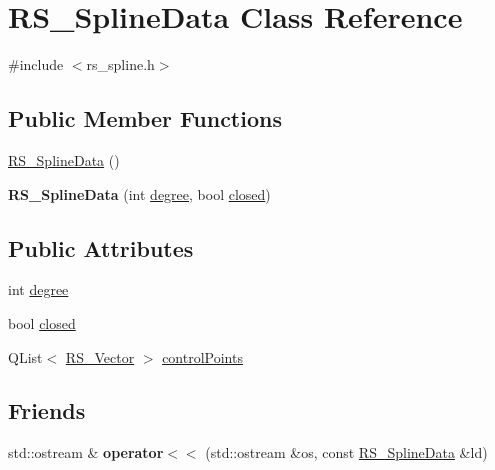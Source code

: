 \hypertarget{classRS__SplineData}{\section{R\-S\-\_\-\-Spline\-Data Class Reference}
\label{classRS__SplineData}
}


{\ttfamily \#include $<$rs\-\_\-spline.\-h$>$}

\subsection*{Public Member Functions}
\begin{DoxyCompactItemize}
\item 
\hyperlink{classRS__SplineData_a883c9ccee35fc6f85ba5f61ce1567aed}{R\-S\-\_\-\-Spline\-Data} ()
\item 
\hypertarget{classRS__SplineData_ae9fa1e3ec4cca9a82a3d3bccc6868823}{{\bfseries R\-S\-\_\-\-Spline\-Data} (int \hyperlink{classRS__SplineData_ad6a4cc91215ce6619c36eeabb68ed801}{degree}, bool \hyperlink{classRS__SplineData_af13d7e07673261f399b15ca310932a17}{closed})}\label{classRS__SplineData_ae9fa1e3ec4cca9a82a3d3bccc6868823}

\end{DoxyCompactItemize}
\subsection*{Public Attributes}
\begin{DoxyCompactItemize}
\item 
int \hyperlink{classRS__SplineData_ad6a4cc91215ce6619c36eeabb68ed801}{degree}
\item 
bool \hyperlink{classRS__SplineData_af13d7e07673261f399b15ca310932a17}{closed}
\item 
Q\-List$<$ \hyperlink{classRS__Vector}{R\-S\-\_\-\-Vector} $>$ \hyperlink{classRS__SplineData_ac6f85522c2d0dbafe00fa3f2190d76ab}{control\-Points}
\end{DoxyCompactItemize}
\subsection*{Friends}
\begin{DoxyCompactItemize}
\item 
\hypertarget{classRS__SplineData_a5777526de5c1190a39ff6eb26b4206dc}{std\-::ostream \& {\bfseries operator$<$$<$} (std\-::ostream \&os, const \hyperlink{classRS__SplineData}{R\-S\-\_\-\-Spline\-Data} \&ld)}\label{classRS__SplineData_a5777526de5c1190a39ff6eb26b4206dc}

\end{DoxyCompactItemize}


